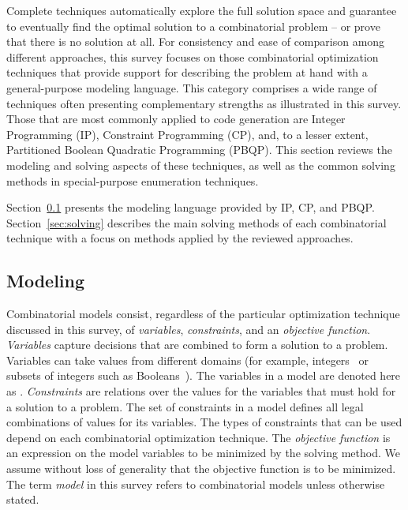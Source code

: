 \documentclass[acmsmall,authorversion,nonacm]{acmart}
\begin{document}
Complete techniques automatically explore the full solution space and
guarantee to eventually find the optimal solution to a combinatorial
problem -- or prove that there is no solution at all.
For consistency and ease of comparison among different approaches,
this survey focuses on those combinatorial optimization techniques
that provide support for describing the problem at hand with a
general-purpose modeling language.
This category comprises a wide range of techniques often presenting
complementary strengths as illustrated in this survey.
Those that are most commonly applied to code generation are Integer
Programming (IP), Constraint Programming (CP), and, to a lesser
extent, Partitioned Boolean Quadratic Programming (PBQP).
This section reviews the modeling and solving aspects of these
techniques, as well as the common solving methods in special-purpose
enumeration techniques.

Section~\ref{sec:modeling} presents the modeling language provided by
IP, CP, and PBQP.
Section~\ref{sec:solving} describes the main solving methods of each
combinatorial technique with a focus on methods applied by the
reviewed approaches.

\subsection{Modeling}\label{sec:modeling}

Combinatorial models consist, regardless of the particular
optimization technique discussed in this survey, of \emph{variables},
\emph{constraints}, and an \emph{objective function}.
\emph{Variables} capture decisions that are combined to form a
solution to a problem.
Variables can take values from different domains (for example,
integers~ or subsets of integers such as Booleans~).
The variables in a model are denoted here as .
\emph{Constraints} are relations over the values for the variables
that must hold for a solution to a problem.
The set of constraints in a model defines all legal combinations of
values for its variables.
The types of constraints that can be used depend on each combinatorial
optimization technique.
The \emph{objective function} is an expression on the model variables
to be minimized by the solving method.
We assume without loss of generality that the objective function is to
be minimized.
The term \emph{model} in this survey refers to combinatorial models
unless otherwise stated.

\newcommand{\technique}[4]{#1 & #2 & #3 & #4\\}
\newcommand{\techniqueNotes}[1]{& \multicolumn{3}{c}{(#1)}\\}
\end{document}
